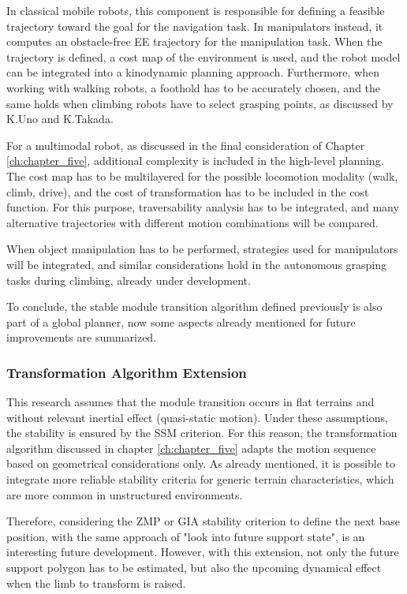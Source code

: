 In classical mobile robots, this component is responsible for defining a feasible trajectory toward the goal for the navigation task. In manipulators instead, it computes an obstacle-free EE trajectory for the manipulation task.
When the trajectory is defined, a cost map of the environment is used, and the robot model can be integrated into a kinodynamic planning approach. 
Furthermore, when working with walking robots, a foothold has to be accurately chosen, and the same holds when climbing robots have to select grasping points, as discussed by K.Uno\cite{KentaroUnoPhD} and K.Takada\cite{LIMBEROTakadaThesis}.  

For a multimodal robot, as discussed in the final consideration of Chapter \ref{ch:chapter_five}, additional complexity is included in the high-level planning. The cost map has to be multilayered for the possible locomotion modality (walk, climb, drive), and the cost of transformation has to be included in the cost function. For this purpose, traversability analysis has to be integrated, and many alternative trajectories with different motion combinations will be compared.  

When object manipulation has to be performed, strategies used for manipulators will be integrated, and similar considerations hold in the autonomous grasping tasks during climbing, already under development. 

To conclude, the stable module transition algorithm defined previously is also part of a global planner, now some aspects already mentioned for future improvements are summarized.
\subsubsection{Transformation Algorithm Extension}

This research assumes that the module transition occurs in flat terrains and without relevant inertial effect (quasi-static motion). Under these assumptions, the stability is ensured by the SSM criterion. For this reason, the transformation algorithm discussed in chapter \ref{ch:chapter_five} adapts the motion sequence based on geometrical considerations only. As already mentioned, it is possible to integrate more reliable stability criteria for generic terrain characteristics, which are more common in unstructured environments. 

Therefore, considering the ZMP or GIA stability criterion to define the next base position, with the same approach of "look into future support state", is an interesting future development. However, with this extension, not only the future support polygon has to be estimated, but also the upcoming dynamical effect when the limb to transform is raised. 


